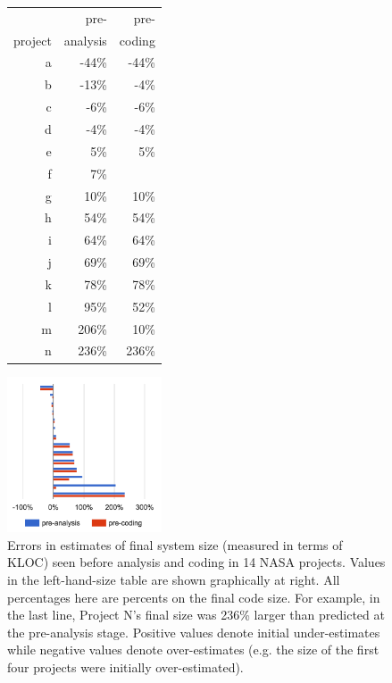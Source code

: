 \documentclass[final,twocolumn]{elsarticle}
\theoremstyle{break}
\begin{document}
 \begin{figure}
      \scriptsize
      \begin{minipage}{.4\linewidth}
      \begin{tabular}{r|rr|}
    & pre-&pre-\\
   project & analysis&coding\\\hline
a&-44\%&-44\%\\
b&-13\%&-4\%\\
c&-6\%&-6\%\\
d&-4\%&-4\%\\
e&5\%&5\%\\
f&7\%&\\
g&10\%&10\%\\
h&54\%&54\%\\
i&64\%&64\%\\
j&69\%&69\%\\
k&78\%&78\%\\
l&95\%&52\%\\
m&206\%&10\%\\
n&236\%&236\%
      \end{tabular}\end{minipage} \begin{minipage}{.33\linewidth}
        \includegraphics[width=1.8in]{nasadata.png}
        \end{minipage}
      \caption{Errors in estimates of final system size (measured in terms of KLOC)
        seen before analysis and coding in 14 NASA projects. Values in the left-hand-size table
        are shown graphically at right.
        All percentages here are percents on the final code size. For example, in the last
        line, Project N's final size was 236\% larger than predicted at the pre-analysis stage.
        Positive values denote initial under-estimates while negative values denote over-estimates
        (e.g. the size of the first four projects were initially over-estimated).}
        \label{fig:nasaloc}
    \end{figure}
\end{document}
